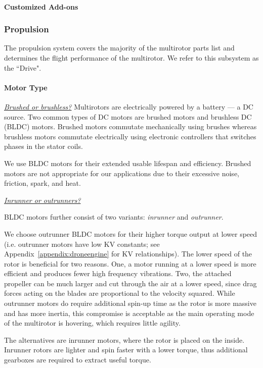\paragraph{Customized Add-ons}

\subsubsection{Propulsion}

The propulsion system covers the majority of the multirotor parts list and determines the flight performance of the multirotor. We refer to this subsystem as the ``Drive".

\paragraph{Motor Type}

\underline{\textit{Brushed or brushless?}}
Multirotors are electrically powered by a battery --- a DC source. Two common types of DC motors are  brushed motors and brushless DC (BLDC) motors. Brushed motors commutate mechanically using brushes whereas brushless motors commutate electrically using electronic controllers that switches phases in the stator coils.

We use  BLDC motors for their extended usable lifespan and efficiency. Brushed motors are not appropriate for our applications due to their excessive noise, friction, spark, and heat.

\underline{\textit{Inrunner or outrunners?}}

BLDC motors further consist of two variants: \textit{inrunner} and \textit{outrunner}. 

We choose outrunner BLDC motors for their higher torque output at lower speed  (i.e. outrunner motors have low KV constants; see Appendix~\ref{appendix:droneengine} for KV relationships). The lower speed of the rotor is beneficial for two reasons. One, a motor running at a lower speed is more efficient and produces fewer high frequency vibrations. Two, the attached propeller can be much larger and cut through the air at a lower speed, since drag forces acting on the blades are proportional to the velocity squared. While outrunner motors do require additional spin-up time as the rotor is more massive and has more inertia, this compromise is acceptable as the main operating mode of the multirotor is hovering, which requires little agility. 

The alternatives are inrunner motors, where the rotor is placed on the inside. Inrunner rotors are lighter and spin faster with a lower torque, thus additional gearboxes are required to extract useful torque\cite{invsoutrunner}.

